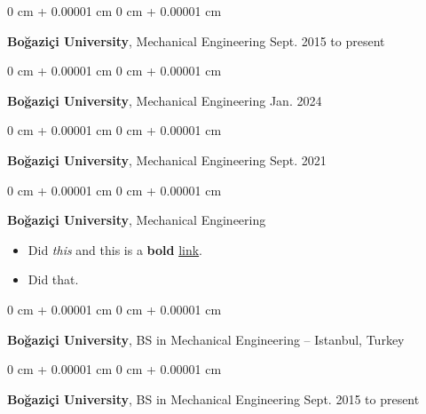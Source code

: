 \documentclass[10pt, letterpaper]{article}
\newenvironment{highlights}{
    \begin{itemize}[
        topsep=0.10 cm,
        parsep=0.10 cm,
        partopsep=0pt,
        itemsep=0pt,
        leftmargin=0 cm + 10pt
    ]
}{
    \end{itemize}
        
    \vspace{-0.20cm}
} %
\newenvironment{onecolentry}{
    \begin{adjustwidth}{
        0 cm + 0.00001 cm
    }{
        0 cm + 0.00001 cm
    }
}{
    \end{adjustwidth}
} %
\begin{document}
        \vspace{0.1 cm}

        \begin{onecolentry}
            \textbf{Boğaziçi University}, Mechanical Engineering \hfill Sept. 2015 to present
        \end{onecolentry}

        \vspace{0.1 cm}

        \begin{onecolentry}
            \textbf{Boğaziçi University}, Mechanical Engineering \hfill Jan. 2024
        \end{onecolentry}

        \vspace{0.1 cm}

        \begin{onecolentry}
            \textbf{Boğaziçi University}, Mechanical Engineering \hfill Sept. 2021
        \end{onecolentry}

        \vspace{0.1 cm}

        \begin{onecolentry}
            \textbf{Boğaziçi University}, Mechanical Engineering \hfill 
            \begin{highlights}
                \item Did \textit{this} and this is a \textbf{bold} \href{https://example.com}{link}.
                \item Did that.
            \end{highlights}
        \end{onecolentry}

        \vspace{0.1 cm}

        \begin{onecolentry}
            \textbf{Boğaziçi University}, BS in Mechanical Engineering -- Istanbul, Turkey \hfill 
        \end{onecolentry}

        \vspace{0.1 cm}

        \begin{onecolentry}
            \textbf{Boğaziçi University}, BS in Mechanical Engineering \hfill Sept. 2015 to present
        \end{onecolentry}

        \vspace{0.1 cm}
\end{document}
